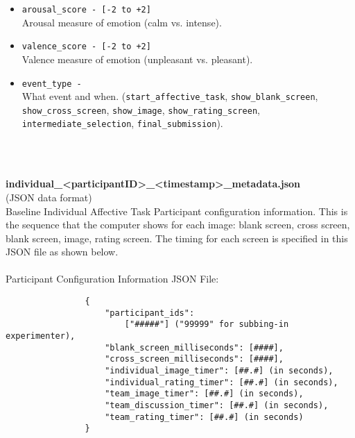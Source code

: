 \begin{description}
\begin{addmargin}[0em]{0em}
\begin{addmargin}[1em]{0em}
\begin{itemize}
                \item \verb|arousal_score - [-2 to +2]|\\Arousal measure of emotion (calm vs. intense).
                \item \verb|valence_score - [-2 to +2]|\\Valence measure of emotion (unpleasant vs. pleasant).
                \item \verb|event_type -|\\What event and when.
                    (\verb|start_affective_task|, \verb|show_blank_screen|,
                    \verb|show_cross_screen|, \verb|show_image|, \verb|show_rating_screen|,
                    \verb|intermediate_selection|, \verb|final_submission|).
            \end{itemize}
        \end{addmargin} %


        \textbf{\\\\}
        \begin{addmargin}[1em]{0em} %
            \label{individual_<participantID>_<timestamp>_metadata.json}
            \textbf{individual\_<participantID>\_<timestamp>\_metadata.json}\\(JSON data format)\\
            Baseline Individual Affective Task Participant configuration information.
            This is the sequence that the computer shows for each image: blank screen, cross screen, blank screen, image, rating screen.
            The timing for each screen is specified in this JSON file as shown below.\\\\
            Participant Configuration Information JSON File:
            \begin{verbatim}
                {
                    "participant_ids":
                        ["#####"] ("99999" for subbing-in experimenter),
                    "blank_screen_milliseconds": [####],
                    "cross_screen_milliseconds": [####],
                    "individual_image_timer": [##.#] (in seconds),
                    "individual_rating_timer": [##.#] (in seconds),
                    "team_image_timer": [##.#] (in seconds),
                    "team_discussion_timer": [##.#] (in seconds),
                    "team_rating_timer": [##.#] (in seconds)
                }
            \end{verbatim}
        \end{addmargin} %



\end{addmargin}
\end{description}
